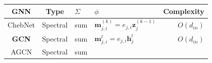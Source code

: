 \begin{table}
	\hspace{-5em}
	\begin{footnotesize}
		\begin{tabular}{ccp{8em}p{22em}r}
			\toprule
			GNN                                                                                                                       &
			Type                                                                                                                      &
			$\Sigma$                                                                                                                  &
			$\phi$                                                                                                                    &
			Complexity                                                                                                                  \\ \midrule
			ChebNet \cite{defferrad2016_chebnet}                                                                                      &
			Spectral                                                                                                                  &
			sum                                                                                                                       &
			$\boldsymbol{m}_{j, i}^{(k)} = e_{j, i}\boldsymbol{z}_j^{(k-1)}$                                                          &
			$O(d_{in})$                                                                                                                 \\
			\textbf{GCN} \cite{kipf2017_gcn}                                                                                          &
			Spectral                                                                                                                  &
			sum                                                                                                                       &
			$\boldsymbol{m}_{j, i}^l = e_{j, i} \boldsymbol{h}_j^l$                                                                   &
			$O(d_{in})$                                                                                                                 \\
			AGCN                                                                                                                      &
			Spectral                                                                                                                  &
			sum                                                                                                                       &

\end{tabular}
\end{footnotesize}
\end{table}
